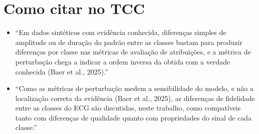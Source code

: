\documentclass[11pt,a4paper]{article}
\begin{document}
\section{Como citar no TCC}
\begin{itemize}
\item “Em dados sintéticos com evidência conhecida, diferenças simples de amplitude ou de duração do padrão entre as classes bastam para produzir diferenças por classe nas métricas de avaliação de atribuições, e a métrica de perturbação chega a indicar a ordem inversa da obtida com a verdade conhecida (Baer et al., 2025).”
\item “Como as métricas de perturbação medem a sensibilidade do modelo, e não a localização correta da evidência (Baer et al., 2025), as diferenças de fidelidade entre as classes do ECG são discutidas, neste trabalho, como compatíveis tanto com diferenças de qualidade quanto com propriedades do sinal de cada classe.”
\end{itemize}
\end{document}
